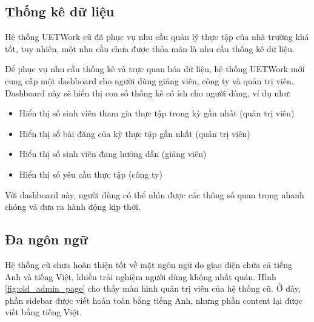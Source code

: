 \documentclass[./../main.tex]{subfiles}
\begin{document}
\hypertarget{thux1ed1ng-kuxea-dux1eef-liux1ec7u}{%
	\subsection{Thống kê dữ
		liệu}\label{thux1ed1ng-kuxea-dux1eef-liux1ec7u}}

Hệ thống UETWork cũ đã phục vụ nhu cầu quản lý thực tập của nhà trường khá tốt, tuy nhiên, một nhu cầu chưa được thỏa mãn là nhu cầu thống kê dữ liệu.

Để phục vụ nhu cầu thống kê và trực quan hóa dữ liệu, hệ thống UETWork mới cung cấp một dashboard cho người dùng giảng viên, công ty và quản trị viên. Dashboard này sẽ hiển thị con số thống kê có ích cho người dùng, ví dụ như:

\begin{itemize}
	\item

	      Hiển thị số sinh viên tham gia thực tập trong kỳ gần nhất (quản trị
	      viên)

	\item

	      Hiển thị số bài đăng của kỳ thực tập gần nhất (quản trị viên)

	\item

	      Hiển thị số sinh viên đang hướng dẫn (giảng viên)

	\item

	      Hiển thị số yêu cầu thực tập (công ty)

\end{itemize}

Với dashboard này, người dùng có thể nhìn được các thông số quan trọng nhanh chóng và đưa ra hành động kịp thời.

\hypertarget{ux111a-nguxf4n-ngux1eef-1}{%
	\subsection{Đa ngôn ngữ}\label{ux111a-nguxf4n-ngux1eef-1}}

Hệ thống cũ chưa hoàn thiện tốt về mặt ngôn ngữ do giao diện chứa cả tiếng Anh và tiếng Việt, khiến trải nghiệm người dùng không nhất quán. Hình \ref{fig:old_admin_page} cho thấy màn hình quản trị viên của hệ thống cũ. Ở đây, phần sidebar được viết hoàn toàn bằng tiếng Anh, nhưng phần content lại được viết bằng tiếng Việt.
\end{document}
